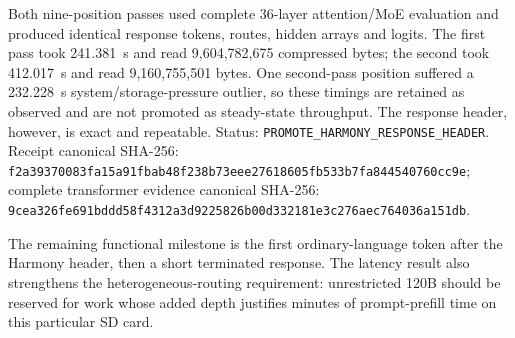 Both nine-position passes used complete 36-layer attention/MoE evaluation and
produced identical response tokens, routes, hidden arrays and logits. The first
pass took 241.381~s and read 9,604,782,675 compressed bytes; the second took
412.017~s and read 9,160,755,501 bytes. One second-pass position suffered a
232.228~s system/storage-pressure outlier, so these timings are retained as
observed and are not promoted as steady-state throughput. The response header,
however, is exact and repeatable. Status:
\texttt{PROMOTE\_HARMONY\_RESPONSE\_HEADER}. Receipt canonical SHA-256:
\texttt{f2a39370083fa15a91fbab48f238b73eee27618605fb533b7fa844540760cc9e};
complete transformer evidence canonical SHA-256:
\texttt{9cea326fe691bddd58f4312a3d9225826b00d332181e3c276aec764036a151db}.

The remaining functional milestone is the first ordinary-language token after
the Harmony header, then a short terminated response. The latency result also
strengthens the heterogeneous-routing requirement: unrestricted 120B should be
reserved for work whose added depth justifies minutes of prompt-prefill time on
this particular SD card.
